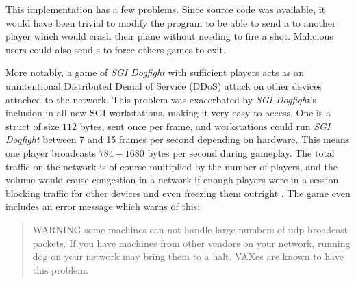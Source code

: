 This implementation has a few problems. Since source code was available, it would have been trivial to modify the program to be able to send a  to another player which would crash their plane without needing to fire a shot. Malicious users could also send s to force others games to exit.

More notably, a game of \textit{SGI Dogfight} with sufficient players acts as an unintentional Distributed Denial of Service (DDoS) attack on other devices attached to the network.
This problem was exacerbated by \textit{SGI Dogfight}'s inclusion in all new SGI workstations, making it very easy to access. One  is a struct of size $112$ bytes, sent once per frame, and workstations could run \textit{SGI Dogfight} between 7 and 15 frames per second depending on hardware. This means one player broadcasts $784-1680$ bytes per second during gameplay. The total traffic on the network is of course multiplied by the number of players, and the volume would cause congestion in a network if enough players were in a session, blocking traffic for other devices and even freezing them outright \cite{mace}. The game even includes an error message which warns of this:

\begin{quote}
  WARNING some machines can not handle large numbers of udp
  broadcast packets.  If you have machines from other vendors
  on your network, running dog on your network may bring them
  to a halt.  VAXes are known to have this problem.
\end{quote}

\cite{dogsrc}
